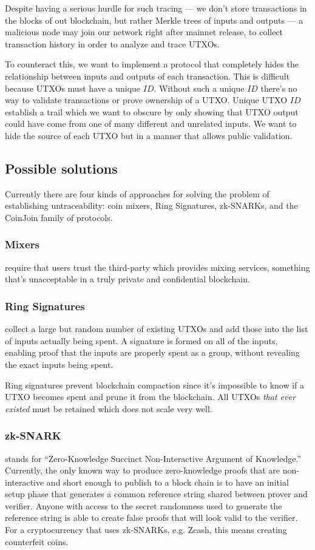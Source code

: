 \documentclass[a4paper, 10pt, conference]{ieeeconf}
\begin{document}
Despite having a serious hurdle for such tracing --- we don't store transactions in the blocks of out blockchain, but rather Merkle trees of inputs and outputs --- a malicious node may join our network right after mainnet release, to collect transaction history in order to analyze and trace UTXOs.

To counteract this, we want to implement a protocol that completely hides the relationship between inputs and outputs of each transaction. This is difficult because UTXOs must have a unique $ID$. Without such a unique $ID$ there's no way to validate transactions or prove ownership of a UTXO. Unique UTXO $ID$ establish a trail which we want to obscure by only showing that UTXO output could have come from one of many different and unrelated inputs. We want to hide the source of each UTXO but in a manner that allows public validation.

\subsection{Possible solutions}
Currently there are four kinds of approaches for solving the problem of establishing untraceability: coin mixers, Ring Signatures, zk-SNARKs, and the CoinJoin family of protocols.

\subsubsection{Mixers} require that users trust the third-party which provides mixing services, something that's unacceptable in a truly private and confidential blockchain.

\subsubsection{Ring Signatures} collect a large but random number of existing UTXOs and add those into the list of inputs actually being spent. A signature is formed on all of the inputs, enabling proof that the inputs are properly spent as a group, without revealing the exact inputs being spent. 

Ring signatures prevent blockchain compaction since it's impossible to know if a UTXO becomes spent and prune it from the blockchain. All UTXOs \textit{that ever existed} must be retained which does not scale very well.

\subsubsection{zk-SNARK} stands for ``Zero-Knowledge Succinct Non-Interactive Argument of Knowledge.'' Currently, the only known way to produce zero-knowledge proofs that are non-interactive and short enough to publish to a block chain is to have an initial setup phase that generates a common reference string shared between prover and verifier. Anyone with access to the secret randomness used to generate the reference string is able to create false proofs that will look valid to the verifier. For a cryptocurrency that uses zk-SNARKs, e.g. Zcash, this means creating counterfeit coins. 
\end{document}
